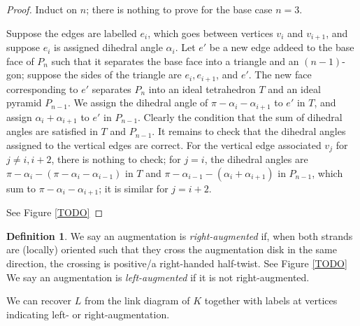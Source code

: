 \documentclass[11pt]{amsart}
\newcommand{\comment}[1]{}
\theoremstyle{plain}
\theoremstyle{definition}
\newtheorem{define}[theorem]{Definition}
\begin{document}
\begin{proof}
Induct on $n$; there is nothing to prove for the base case $n=3$.

Suppose the edges are labelled $e_i$,
which goes between vertices $v_i$ and $v_{i+1}$,
and suppose $e_i$ is assigned dihedral angle $\alpha_i$.
Let $e'$ be a new edge addeed to the base face of $P_n$
such that it separates the base face into a triangle and
an $(n-1)$-gon;
suppose the sides of the triangle are
$e_i, e_{i+1}$, and $e'$.
The new face corresponding to $e'$ separates $P_n$ into
an ideal tetrahedron $T$ and an ideal pyramid $P_{n-1}$.
We assign the dihedral angle of $\pi - \alpha_i - \alpha_{i+1}$
to $e'$ in $T$, and assign $\alpha_i + \alpha_{i+1}$ to $e'$ in $P_{n-1}$.
Clearly the condition that the sum of dihedral angles are satisfied
in $T$ and $P_{n-1}$.
It remains to check that the dihedral angles assigned to the vertical edges
are correct.
For the vertical edge associated $v_j$ for $j \neq i, i+2$,
there is nothing to check;
for $j = i$, the dihedral angles are
$\pi - \alpha_i - (\pi - \alpha_i - \alpha_{i-1})$
in $T$ and $\pi - \alpha_{i-1} - (\alpha_i + \alpha_{i+1})$ in $P_{n-1}$,
which sum to $\pi - \alpha_i - \alpha_{i+1}$;
it is similar for $j = i+2$.

See Figure \ref{TODO}
\end{proof}

\begin{define}
We say an augmentation is \emph{right-augmented} if, when both strands are
(locally) oriented such that they cross the augmentation disk in the same
direction, the crossing is positive/a right-handed half-twist. See Figure
\ref{TODO}
We say an augmentation is \emph{left-augmented} if it is not right-augmented.
\end{define}

We can recover $L$ from the link diagram of $K$
together with labels at vertices indicating left- or right-augmentation.


\comment{
\begin{define}
Given a face $f$ of the original link diagram the \emph{augmentation sequence}
of $f$, denoted $\sigma_f$, is a cyclical sequence of symbols $0, L, R$ indexed
by vertices of $f$ going counter-clockwise, where, for $v \in \partial f$, the
$v$-th element is
\[
\sigma_f^v = 
\begin{cases}
0 \text{ if $v$ is not augmented} \\
L \text{ if $v$ is left-augmented} \\
R \text{ if $v$ is right-augmented}
\end{cases}
\]
\end{define}
}
\end{document}
